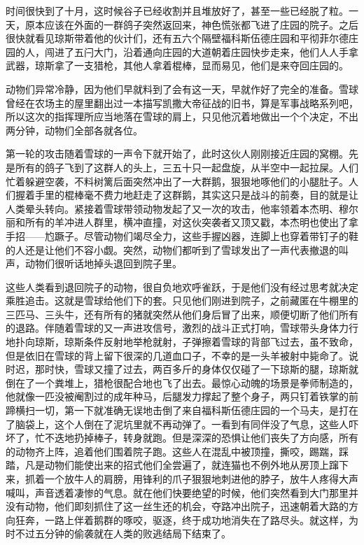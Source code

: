 时间很快到了十月，这时候谷子已经收割并且堆放好了，甚至一些已经脱了粒。一天，原本应该在外面的一群鸽子突然返回来，神色慌张都飞进了庄园的院子。之后很快就看见琼斯带着他的伙计们，还有五六个隔壁福科斯伍德庄园和平彻菲尔德庄园的人，闯进了五闩大门，沿着通向庄园的大道朝着庄园快步走来，他们人人手拿武器，琼斯拿了一支猎枪，其他人拿着棍棒，显而易见，他们是来夺回庄园的。

动物们异常冷静，因为他们早就料到了会有这一天，早就作好了完全的准备。雪球曾经在农场主的屋里翻出过一本描写凯撒大帝征战的旧书，算是军事战略系列吧，所以这次的指挥理所应当地落在雪球的肩上，只见他沉着地做出一个个决定，不出两分钟，动物们全部各就各位。

第一轮的攻击随着雪球的一声令下就开始了，此时这伙人刚刚接近庄园的窝棚。先是所有的鸽子飞到了这群人的头上，三五十只一起盘旋，从半空中一起拉屎。人们忙着躲避空袭，不料树篱后面突然冲出了一大群鹅，狠狠地啄他们的小腿肚子。人们握着手里的棍棒毫不费力地赶走了这群鹅，其实这只是战斗的前奏，目的就是让人类晕头转向。紧接着雪球带领动物发起了又一次的攻击，他率领着本杰明、穆尔丽和所有的羊冲进人群里，横冲直撞，对这伙突袭者又顶又戳，本杰明也使出了拿手招——尥蹶子。尽管动物们竭尽全力，这些手握凶器，连脚上也穿着带钉子的鞋的人还是让他们不容小觑。突然，动物们都听到了雪球发出了一声代表撤退的叫声，动物们很听话地掉头退回到院子里。

这些人类看到退回院子的动物，很自负地欢呼雀跃，于是他们没有经过思考就决定乘胜追击。这就是雪球给他们下的套。只见他们刚进到院子，之前藏匿在牛棚里的三匹马、三头牛，还有所有的猪就突然从他们身后冒了出来，顺便切断了他们所有的退路。伴随着雪球的又一声进攻信号，激烈的战斗正式打响，雪球带头身体力行地扑向琼斯，琼斯条件反射地举枪就射，子弹擦着雪球的背部飞过去，虽不致命，但是依旧在雪球的背上留下很深的几道血口子，不幸的是一头羊被射中毙命了。说时迟，那时快，雪球又撞了过去，两百多斤的身体仅仅碰了一下琼斯的腿，琼斯就倒在了一个粪堆上，猎枪很配合地也飞了出去。最惊心动魄的场景是拳师制造的，他就像一匹没被阉割过的成年种马，后腿发力撑起了整个身子，两只钉着铁掌的前蹄横扫一切，第一下就准确无误地击倒了来自福科斯伍德庄园的一个马夫，是打在了脑袋上，这个人倒在了泥坑里就不再动弹了。一看到有同伴没了气息，这些人吓坏了，忙不迭地扔掉棒子，转身就跑。但是深深的恐惧让他们丧失了方向感，所有的动物齐上阵，追着他们围着院子跑。这些人在混乱中被顶撞，撕咬，踢踹，踩踏，凡是动物们能使出来的招式他们全尝遍了，就连猫也不例外地从房顶上蹿下来，抓着一个放牛人的肩膀，用锋利的爪子狠狠地刺进他的脖子，放牛人疼得大声喊叫，声音透着凄惨的气息。就在他们快要绝望的时候，他们突然看到大门那里并没有动物，他们即刻抓住了这一丝生还的机会，夺路冲出院子，迅速朝着大路的方向狂奔，一路上伴着鹅群的啄咬，驱逐，终于成功地消失在了路尽头。就这样，为时不过五分钟的偷袭就在人类的败逃结局下结束了。

